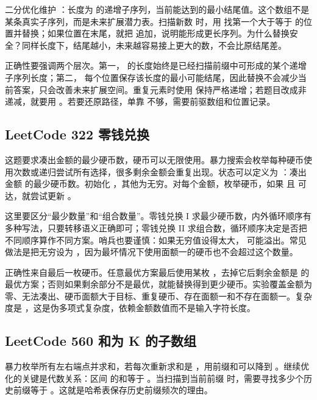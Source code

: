 二分优化维护 ：长度为  的递增子序列，当前能达到的最小结尾值。这个数组不是某条真实子序列，而是未来扩展潜力表。扫描新数  时，用  找第一个大于等于  的位置并替换；如果位置在末尾，就把  追加，说明能形成更长序列。为什么替换安全？同样长度下，结尾越小，未来越容易接上更大的数，不会比原结尾差。

正确性要强调两个层次。第一， 的长度始终是已经扫描前缀中可形成的某个递增子序列长度；第二， 每个位置保存该长度的最小可能结尾，因此替换不会减少当前答案，只会改善未来扩展空间。重复元素时使用  保持严格递增；若题目改成非递减，就要用 。若要还原路径，单靠  不够，需要前驱数组和位置记录。

\subsection{LeetCode 322 零钱兑换}

这题要求凑出金额的最少硬币数，硬币可以无限使用。暴力搜索会枚举每种硬币使用次数或递归尝试所有选择，很多剩余金额会重复出现。状态可以定义为 ：凑出金额  的最少硬币数。初始化 ，其他为无穷。对每个金额，枚举硬币，如果  且  可达，就尝试更新 。

这里要区分“最少数量”和“组合数量”。零钱兑换 I 求最少硬币数，内外循环顺序有多种写法，只要转移语义正确即可；零钱兑换 II 求组合数，循环顺序决定是否把不同顺序算作不同方案。哨兵也要谨慎：如果无穷值设得太大， 可能溢出。常见做法是把无穷设为 ，因为最坏情况下使用面额一的硬币也不会超过这个数量。

正确性来自最后一枚硬币。任意最优方案最后使用某枚 ，去掉它后剩余金额是  的最优方案；否则如果剩余部分不是最优，就能替换得到更少硬币。实验覆盖金额为零、无法凑出、硬币面额大于目标、重复硬币、存在面额一和不存在面额一。复杂度是 ，这是伪多项式复杂度，依赖金额数值而不是输入字符长度。

\subsection{LeetCode 560 和为 K 的子数组}

暴力枚举所有左右端点并求和，若每次重新求和是 ，用前缀和可以降到 。继续优化的关键是代数关系：区间 \code{(i,j]} 的和等于 。当扫描到当前前缀  时，需要寻找多少个历史前缀等于 。这就是哈希表保存历史前缀频次的理由。

